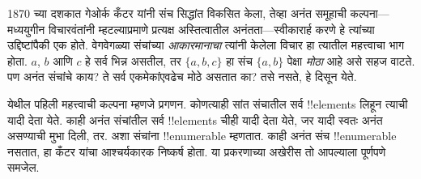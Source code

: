 \documentclass[../../../include/open-logic-section]{subfiles}
\begin{document}


1870 च्या दशकात गेओर्क कँटर यांनी संच सिद्धांत
विकसित केला, तेव्हा अनंत समूहाची कल्पना---मध्ययुगीन विचारवंतांनी
म्हटल्याप्रमाणे प्रत्यक्ष अस्तित्वातील अनंतता---स्वीकारार्ह करणे हे
त्यांच्या उद्दिष्टांपैकी एक होते. वेगवेगळ्या संचांच्या \emph{आकारमानाचा}
त्यांनी केलेला विचार हा त्यातील महत्त्वाचा भाग होता. $a$, $b$ आणि $c$
हे सर्व भिन्न असतील, तर $\{a, b, c\}$ हा संच $\{a, b\}$ पेक्षा
\emph{मोठा} आहे असे सहज वाटते. पण अनंत संचांचे काय? ते सर्व
एकमेकांएवढेच मोठे असतात का? तसे नसते, हे दिसून येते.

येथील पहिली महत्त्वाची कल्पना म्हणजे प्रगणन. कोणत्याही सांत संचातील
सर्व !!{element}s लिहून त्याची यादी देता येते. काही अनंत संचांतील
सर्व !!{element}s चीही यादी देता येते, जर यादी स्वतः अनंत असण्याची
मुभा दिली, तर. अशा संचांना !!{enumerable} म्हणतात. काही अनंत संच
!!{enumerable} नसतात, हा कँटर यांचा आश्चर्यकारक निष्कर्ष होता.
या प्रकरणाच्या अखेरीस तो आपल्याला पूर्णपणे समजेल.
\end{document}
